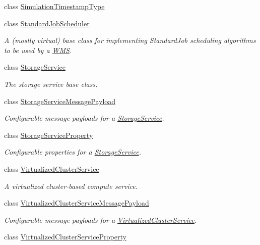 \begin{DoxyCompactItemize}
class \hyperlink{classwrench_1_1_simulation_timestamp_type}{Simulation\+Timestamp\+Type}
\item 
class \hyperlink{classwrench_1_1_standard_job_scheduler}{Standard\+Job\+Scheduler}
\begin{DoxyCompactList}\small\item\em A (mostly virtual) base class for implementing Standard\+Job scheduling algorithms to be used by a \hyperlink{classwrench_1_1_w_m_s}{W\+MS}. \end{DoxyCompactList}\item 
class \hyperlink{classwrench_1_1_storage_service}{Storage\+Service}
\begin{DoxyCompactList}\small\item\em The storage service base class. \end{DoxyCompactList}\item 
class \hyperlink{classwrench_1_1_storage_service_message_payload}{Storage\+Service\+Message\+Payload}
\begin{DoxyCompactList}\small\item\em Configurable message payloads for a \hyperlink{classwrench_1_1_storage_service}{Storage\+Service}. \end{DoxyCompactList}\item 
class \hyperlink{classwrench_1_1_storage_service_property}{Storage\+Service\+Property}
\begin{DoxyCompactList}\small\item\em Configurable properties for a \hyperlink{classwrench_1_1_storage_service}{Storage\+Service}. \end{DoxyCompactList}\item 
class \hyperlink{classwrench_1_1_virtualized_cluster_service}{Virtualized\+Cluster\+Service}
\begin{DoxyCompactList}\small\item\em A virtualized cluster-\/based compute service. \end{DoxyCompactList}\item 
class \hyperlink{classwrench_1_1_virtualized_cluster_service_message_payload}{Virtualized\+Cluster\+Service\+Message\+Payload}
\begin{DoxyCompactList}\small\item\em Configurable message payloads for a \hyperlink{classwrench_1_1_virtualized_cluster_service}{Virtualized\+Cluster\+Service}. \end{DoxyCompactList}\item 
class \hyperlink{classwrench_1_1_virtualized_cluster_service_property}{Virtualized\+Cluster\+Service\+Property}

\end{DoxyCompactItemize}
